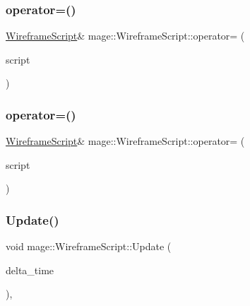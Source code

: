 \subsubsection{\texorpdfstring{operator=()}{operator=()}\hspace{0.1cm}{\footnotesize\ttfamily [1/2]}}
{\footnotesize\ttfamily \hyperlink{classmage_1_1_wireframe_script}{Wireframe\+Script}\& mage\+::\+Wireframe\+Script\+::operator= (\begin{DoxyParamCaption}\item[{const \hyperlink{classmage_1_1_wireframe_script}{Wireframe\+Script} \&}]{script }\end{DoxyParamCaption})\hspace{0.3cm}{\ttfamily [delete]}}

\hypertarget{classmage_1_1_wireframe_script_a6be79bd5b62f7cf6e9d1237dba0a5bdc}{}\label{classmage_1_1_wireframe_script_a6be79bd5b62f7cf6e9d1237dba0a5bdc} 
\subsubsection{\texorpdfstring{operator=()}{operator=()}\hspace{0.1cm}{\footnotesize\ttfamily [2/2]}}
{\footnotesize\ttfamily \hyperlink{classmage_1_1_wireframe_script}{Wireframe\+Script}\& mage\+::\+Wireframe\+Script\+::operator= (\begin{DoxyParamCaption}\item[{\hyperlink{classmage_1_1_wireframe_script}{Wireframe\+Script} \&\&}]{script }\end{DoxyParamCaption})\hspace{0.3cm}{\ttfamily [delete]}}

\hypertarget{classmage_1_1_wireframe_script_af077736607ad22f66d8553066af51760}{}\label{classmage_1_1_wireframe_script_af077736607ad22f66d8553066af51760} 
\subsubsection{\texorpdfstring{Update()}{Update()}}
{\footnotesize\ttfamily void mage\+::\+Wireframe\+Script\+::\+Update (\begin{DoxyParamCaption}\item[{double}]{delta\+\_\+time }\end{DoxyParamCaption})\hspace{0.3cm}{\ttfamily [override]}, {\ttfamily [virtual]}}

